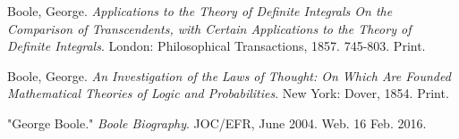 \documentclass[12]{article} %
\begin{document}
\newpage



\begin{thebibliography}{9}
Boole, George. 
\textit{Applications to the Theory of Definite Integrals On the Comparison of Transcendents, with Certain Applications to the Theory of Definite Integrals}. 
London: Philosophical Transactions, 1857. 745-803. Print.
 
Boole, George. 
\textit{An Investigation of the Laws of Thought: On Which Are Founded Mathematical Theories of Logic and Probabilities}.
New York: Dover, 1854. Print.
 
"George Boole."
\textit{Boole Biography}.
JOC/EFR, June 2004. Web. 16 Feb. 2016. 
\end{thebibliography}
\end{document}
